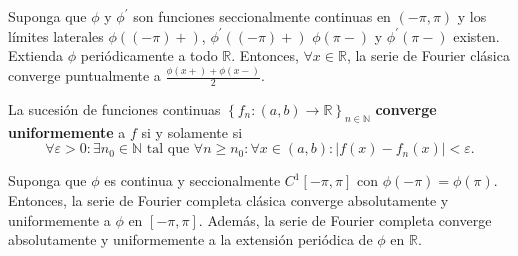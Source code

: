 \begin{theorem}
    Suponga que $\phi$ y $\phi^{\prime}$ son funciones seccionalmente
    continuas en $\left(-\pi,\pi\right)$ y los límites laterales
    $\phi\left(\left(-\pi\right)+\right)$,
    $\phi^{\prime}\left(\left(-\pi\right)+\right)$
    $\phi\left(\pi-\right)$ y $\phi^{\prime}\left(\pi-\right)$
    existen.
    Extienda $\phi$ periódicamente a todo $\mathbb{R}$.
    Entonces, $\forall x\in\mathbb{R}$, la serie de Fourier clásica
    converge puntualmente a
    $\frac{\phi\left(x+\right)+\phi\left(x-\right)}{2}$.
\end{theorem}

\begin{definition}
    La sucesión de funciones continuas
    \begin{math}
        \left\{
        f_{n}\colon\left(a,b\right)\to\mathbb{R}
        \right\}_{n\in\mathbb{N}}
    \end{math}
    \textbf{converge uniformemente} a $f$ si y solamente si
    \begin{equation*}
        \forall\varepsilon>0:
        \exists n_{0}\in\mathbb{N}
        \text{ tal que }
        \forall n\geq n_{0}:
        \forall x\in\left(a,b\right):
        \left|
        f\left(x\right)-
        f_{n}\left(x\right)
        \right|<
        \varepsilon.
    \end{equation*}
\end{definition}

\begin{theorem}
    Suponga que $\phi$ es continua y seccionalmente
    $C^{1}\left[-\pi,\pi\right]$ con
    $\phi\left(-\pi\right)=\phi\left(\pi\right)$.
    Entonces, la serie de Fourier completa clásica converge
    absolutamente y uniformemente a $\phi$ en
    $\left[-\pi,\pi\right]$.
    Además, la serie de Fourier completa converge absolutamente y
    uniformemente a la extensión periódica de $\phi$ en $\mathbb{R}$.
\end{theorem}


